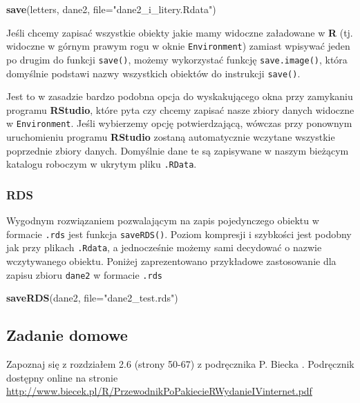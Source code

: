 \documentclass[]{book}
\newenvironment{Shaded}{\begin{snugshade}}{\end{snugshade}}
\newcommand{\KeywordTok}[1]{\textcolor[rgb]{0.13,0.29,0.53}{\textbf{#1}}}
\newcommand{\DataTypeTok}[1]{\textcolor[rgb]{0.13,0.29,0.53}{#1}}
\newcommand{\StringTok}[1]{\textcolor[rgb]{0.31,0.60,0.02}{#1}}
\newcommand{\NormalTok}[1]{#1}
\theoremstyle{definition}
\theoremstyle{definition}
\theoremstyle{definition}
\theoremstyle{remark}
\begin{document}
\begin{Shaded}
\begin{Highlighting}[]
\KeywordTok{save}\NormalTok{(letters, dane2, }\DataTypeTok{file=}\StringTok{"dane2_i_litery.Rdata"}\NormalTok{)}
\end{Highlighting}
\end{Shaded}

Jeśli chcemy zapisać wszystkie obiekty jakie mamy widoczne załadowane w
\textbf{R} (tj. widoczne w górnym prawym rogu w oknie
\texttt{Environment}) zamiast wpisywać jeden po drugim do funkcji
\texttt{save()}, możemy wykorzystać funkcję \texttt{save.image()}, która
domyślnie podstawi nazwy wszystkich obiektów do instrukcji
\texttt{save()}.

Jest to w zasadzie bardzo podobna opcja do wyskakującego okna przy
zamykaniu programu \textbf{RStudio}, które pyta czy chcemy zapisać nasze
zbiory danych widoczne w \texttt{Environment}. Jeśli wybierzemy opcję
potwierdzającą, wówczas przy ponownym uruchomieniu programu
\textbf{RStudio} zostaną automatycznie wczytane wszystkie poprzednie
zbiory danych. Domyślnie dane te są zapisywane w naszym bieżącym
katalogu roboczym w ukrytym pliku \texttt{.RData}.

\subsubsection{RDS}\label{rds-1}

Wygodnym rozwiązaniem pozwalającym na zapis pojedynczego obiektu w
formacie \texttt{.rds} jest funkcja \texttt{saveRDS()}. Poziom kompresji
i szybkości jest podobny jak przy plikach \texttt{.Rdata}, a
jednocześnie możemy sami decydować o nazwie wczytywanego obiektu.
Poniżej zaprezentowano przykładowe zastosowanie dla zapisu zbioru
\texttt{dane2} w formacie \texttt{.rds}

\begin{Shaded}
\begin{Highlighting}[]
\KeywordTok{saveRDS}\NormalTok{(dane2, }\DataTypeTok{file=}\StringTok{"dane2_test.rds"}\NormalTok{)}
\end{Highlighting}
\end{Shaded}

\subsection*{Zadanie domowe}\label{zadanie-domowe-2}

Zapoznaj się z rozdziałem 2.6 (strony 50-67) z podręcznika P. Biecka
\citep{biecek2016}. Podręcznik dostępny online na stronie
\url{http://www.biecek.pl/R/PrzewodnikPoPakiecieRWydanieIVinternet.pdf}
\end{document}
